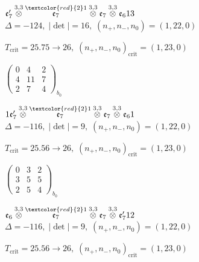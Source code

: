 \documentclass[10pt]{article}
\begin{document}
\smallskip

$\mathfrak{e}_7'\overset{3,3}{\otimes}\overset{\textcolor{red}{2}1}{\mathfrak{e}_7}\overset{3,3}{\otimes}\mathfrak{e}_7\overset{3,3}{\otimes}\mathfrak{e}_613$ \quad $\Delta=-124,\; |\det|=16,\; (n_+,n_-,n_0)=(1,22,0)$

\hspace{1em}$T_{\text{crit}}=25.75 \to 26,\; (n_+,n_-,n_0)_{\text{crit}}=(1,23,0)$

\hspace{2em}$\left(\begin{smallmatrix}0 & 4 & 2 \\ 4 & 11 & 7 \\ 2 & 7 & 4\end{smallmatrix}\right)_{\!b_0}$

\smallskip

$1\mathfrak{e}_7'\overset{3,3}{\otimes}\overset{\textcolor{red}{2}1}{\mathfrak{e}_7}\overset{3,3}{\otimes}\mathfrak{e}_7\overset{3,3}{\otimes}\mathfrak{e}_61$ \quad $\Delta=-116,\; |\det|=9,\; (n_+,n_-,n_0)=(1,22,0)$

\hspace{1em}$T_{\text{crit}}=25.56 \to 26,\; (n_+,n_-,n_0)_{\text{crit}}=(1,23,0)$

\hspace{2em}$\left(\begin{smallmatrix}0 & 3 & 2 \\ 3 & 5 & 5 \\ 2 & 5 & 4\end{smallmatrix}\right)_{\!b_0}$

\smallskip

$\mathfrak{e}_6\overset{3,3}{\otimes}\overset{\textcolor{red}{2}1}{\mathfrak{e}_7}\overset{3,3}{\otimes}\mathfrak{e}_7\overset{3,3}{\otimes}\mathfrak{e}_7'12$ \quad $\Delta=-116,\; |\det|=9,\; (n_+,n_-,n_0)=(1,22,0)$

\hspace{1em}$T_{\text{crit}}=25.56 \to 26,\; (n_+,n_-,n_0)_{\text{crit}}=(1,23,0)$
\end{document}
